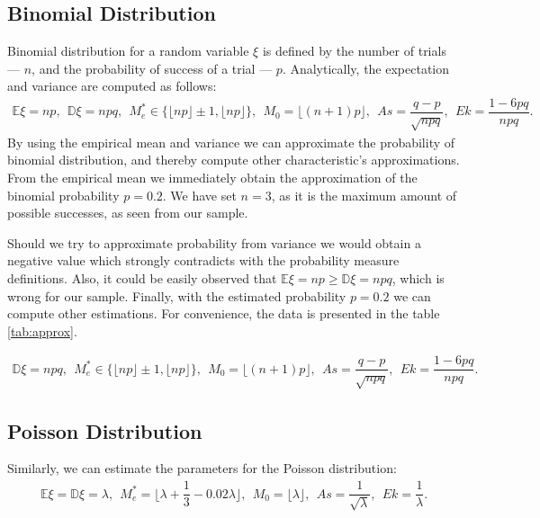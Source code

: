 \documentclass[final,3p,times,onecolumn]{elsarticle}
\begin{document}
\subsection{Binomial Distribution}
Binomial distribution for a random variable $\xi$ is defined by the number of trials --- $n$,
and the probability of success of a trial --- $p$. Analytically, the expectation and variance are computed as follows:
\begin{gather*}
\mathbb{E}\xi = np, \ \ 
\mathbb{D}\xi = npq, \ \ 
M_e^* \in \{\lfloor np \rfloor \pm 1, \lfloor np \rfloor\}, \ \ 
M_0 = \lfloor (n+1)p \rfloor, \ \ 
As = \dfrac{q - p}{\sqrt{npq}}, \ \ 
Ek = \dfrac{1 - 6pq}{npq}.
\end{gather*}
By using the empirical mean and variance we can approximate the probability of binomial distribution, and thereby compute other characteristic's approximations. 
From the empirical mean we immediately obtain the approximation of the binomial probability $p = 0.2$. 
We have set $n = 3$, as it is the maximum amount of possible successes, as seen from our sample. 

Should we try to approximate probability from variance we would obtain a negative value which strongly contradicts with the probability measure definitions.
Also, it could be easily observed that $\mathbb{E}\xi = np \geq \mathbb{D}\xi = npq$, which is wrong for our sample. 
Finally, with the estimated probability $p = 0.2$ we can compute other estimations. 
For convenience, the data is presented in the table \ref{tab:approx}.

\begin{gather*} 
\mathbb{D}\xi = npq, \ \ 
M_e^* \in \{\lfloor np \rfloor \pm 1, \lfloor np \rfloor\}, \ \ 
M_0 = \lfloor (n+1)p \rfloor, \ \ 
As = \dfrac{q - p}{\sqrt{npq}}, \ \ 
Ek = \dfrac{1 - 6pq}{npq}.
\end{gather*}

\subsection{Poisson Distribution}
Similarly, we can estimate the parameters for the Poisson distribution: 
\begin{gather*}
\mathbb{E}\xi = \mathbb{D}\xi = \lambda, \ \ 
M_e^* = \lfloor \lambda + \dfrac{1}{3} - 0.02\lambda \rfloor, \ \ 
M_0 = \lfloor \lambda \rfloor, \ \ 
As = \dfrac{1}{\sqrt{\lambda}}, \ \ 
Ek = \dfrac{1}{\lambda}.
\end{gather*}
\end{document}

